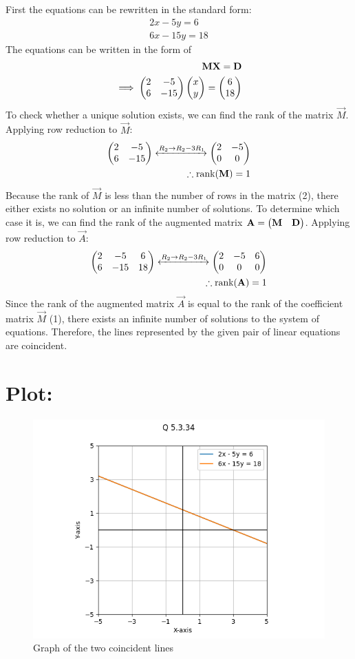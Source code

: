 \documentclass[a4paper, 12pt]{article}
\begin{document}
First the equations can be rewritten in the standard form:
\begin{align}
    2x - 5y = 6 \tag{1}\\
    6x - 15y = 18 \tag{2}
\end{align}
The equations can be written in the form of
\begin{align}
    \mathbf{M}\mathbf{X} = \mathbf{D}\\
    \implies \begin{pmatrix}2 & -5 \\ 6 & -15\end{pmatrix}\begin{pmatrix}x \\ y\end{pmatrix} = \begin{pmatrix}6 \\ 18\end{pmatrix}
\end{align}
To check whether a unique solution exists, we can find the rank of the matrix $\vec{M}$.
Applying row reduction to $\vec{M}$:
\begin{align}
    \begin{pmatrix}2 & -5 \\ 6 & -15\end{pmatrix} \xleftrightarrow{R_2 \rightarrow R_2 - 3R_1} \begin{pmatrix}2 & -5 \\ 0 & 0\end{pmatrix}\\
    \therefore \text{rank}(\mathbf{M}) = 1
\end{align}
Because the rank of $\vec{M}$ is less than the number of rows in the matrix (2), there either exists no solution or an infinite number of solutions. To determine which case it is, we can find the rank of the augmented matrix $\mathbf{A} = \begin{pmatrix}\mathbf{M} & \mathbf{D}\end{pmatrix}$.
Applying row reduction to $\vec{A}$:
\begin{align}
    \begin{pmatrix}2 & -5 & 6 \\ 6 & -15 & 18\end{pmatrix} \xleftrightarrow{R_2 \rightarrow R_2 - 3R_1} \begin{pmatrix}2 & -5 & 6 \\ 0 & 0 & 0\end{pmatrix}\\
    \therefore \text{rank}(\mathbf{A}) = 1
\end{align}
Since the rank of the augmented matrix $\vec{A}$ is equal to the rank of the coefficient matrix $\vec{M}$ (1), there exists an infinite number of solutions to the system of equations. Therefore, the lines represented by the given pair of linear equations are coincident.

\section{Plot: }
\begin{figure}[h!]
    \centering
    \includegraphics[width=\columnwidth]{figs/plot.png}
    \caption{Graph of the two coincident lines}
    \label{fig:5.3.34}
\end{figure}
\end{document}
